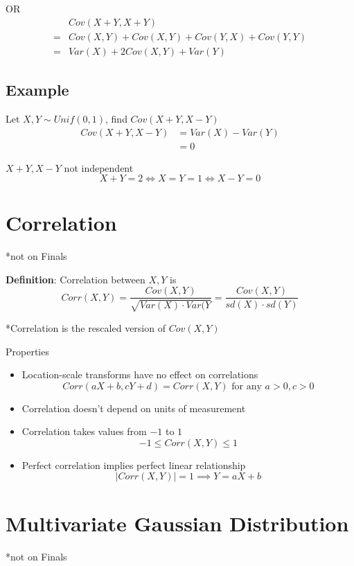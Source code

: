OR
\begin{align*}
&Cov(X + Y, X + Y)  \\
=& Cov(X, Y) + Cov(X, Y) +  Cov(Y, X) + Cov(Y, Y)  \\
=& Var(X) + 2Cov(X, Y) + Var(Y)
\end{align*}

\subsection{Example}
Let $X,Y \sim Unif(0, 1)$, find $Cov(X + Y, X-Y)$ \\

 \begin{align*}
    Cov( X+ Y, X - Y) &= Var(X) - Var(Y) \\
                      &= 0
\end{align*}

$X+ Y, X - Y$ not independent
\[
  X + Y = 2 \iff X = Y = 1 \iff X - Y = 0
\] 


\section{Correlation}
*not on Finals

\begin{framed}
   \textbf{Definition}: Correlation between $X, Y$ is
   \[
     Corr(X, Y) = \frac{Cov(X, Y)}{ \sqrt{Var(X) \cdot Var(Y}} = \frac{Cov(X, Y)}{sd(X) \cdot sd(Y)}
   \] 

   *Correlation is the rescaled version of $Cov(X, Y)$
\end{framed}

Properties
\begin{itemize}
   \item Location-scale transforms have no effect on correlations
      \[
        Corr(aX + b, cY + d)  = Corr(X, Y) \text{ for any } a > 0, c > 0
      \] 
   \item Correlation doesn't depend on units of measurement
   \item Correlation takes values from $-1 $ to $1$ 
      \[
        -1 \leq Corr(X, Y) \leq 1
      \] 
   \item Perfect correlation implies perfect linear relationship
      \[
        |Corr(X, Y) | = 1 \implies Y = aX + b
      \] 
\end{itemize}

\section{Multivariate Gaussian Distribution}
*not on Finals

